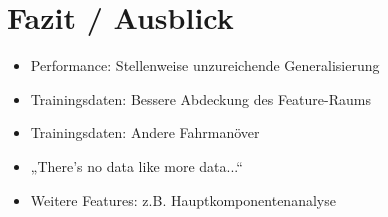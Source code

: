 
\chapter{Fazit / Ausblick} %
\label{cha:Fazit_Ausblick}
\begin{itemize}
	\item Performance: Stellenweise unzureichende Generalisierung
	\item Trainingsdaten: Bessere Abdeckung des Feature-Raums
	\item Trainingsdaten: Andere Fahrmanöver
	\item „There's no data like more data...“
	\item Weitere Features: z.B. Hauptkomponentenanalyse
\end{itemize}
